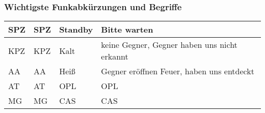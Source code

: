 \subsubsection{Wichtigste Funkabkürzungen und Begriffe}
	\begin{tabular}{|p{2cm}|p{4cm}||p{3cm}|p{4cm}|} \hline
		\acs{SPZ}	& \acl{SPZ}	& Standby	& Bitte warten \\ \hline 
		\acs{KPZ}	& \acl{KPZ}	& Kalt		& keine Gegner, Gegner haben uns nicht erkannt \\ \hline
		\acs{AA}	& \acl{AA}	& Heiß 		& Gegner eröffnen Feuer, haben uns entdeckt \\ \hline
		\acs{AT}	& \acl{AT}	& \acs{OPL}	& \acl{OPL} \\ \hline
		\acs{MG}	& \acl{MG}	& \acs{CAS}	& \acl{CAS} \\ \hline
	\end{tabular}


